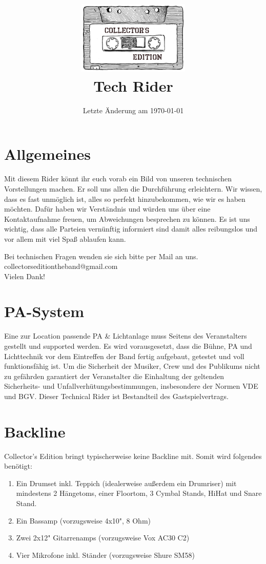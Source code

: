 \documentclass{article}
\title{\includegraphics[width=0.4\textwidth]{figures/BandLogo} \\Tech Rider}
\date{Letzte Änderung am \today}
\begin{document}
  \maketitle
  \thispagestyle{empty}

  \section*{Allgemeines}
  Mit diesem Rider könnt ihr euch vorab ein Bild von unseren technischen Vorstellungen machen.
   Er soll uns allen die Durchführung erleichtern. Wir wissen, dass es fast unmöglich ist, alles so
   perfekt hinzubekommen, wie wir es haben möchten. Dafür haben wir Verständnis und würden uns über eine
   Kontaktaufnahme freuen, um Abweichungen besprechen zu können. Es ist uns wichtig, dass alle Parteien
   vernünftig informiert sind damit alles reibungslos und vor allem mit viel Spaß ablaufen kann.

   Bei technischen Fragen wenden sie sich bitte per Mail an uns.\\
   collectorseditiontheband@gmail.com\\
   Vielen Dank!

  \section*{PA-System}

  Eine zur Location passende PA \& Lichtanlage muss Seitens des Veranstalters gestellt und supported
  werden. Es wird vorausgesetzt, dass die Bühne, PA und Lichttechnik vor dem Eintreffen der Band fertig
  aufgebaut, getestet und voll funktionsfähig ist. Um die Sicherheit der Musiker, Crew und des Publikums
  nicht zu gefährden garantiert der Veranstalter die Einhaltung der geltenden Sicherheits- und
  Unfallverhütungsbestimmungen, insbesondere der Normen VDE und BGV. Dieser Technical Rider ist
  Bestandteil des Gastspielvertrags.

  \section*{Backline}

  Collector's Edition bringt typischerweise keine Backline mit. Somit wird folgendes
  benötigt:

  \begin{enumerate}
  \item Ein Drumset inkl. Teppich (idealerweise außerdem ein Drumriser) mit
  mindestens 2 Hängetoms, einer Floortom, 3 Cymbal Stands, HiHat und Snare Stand.
  \item Ein Bassamp (vorzugsweise 4x10", 8 Ohm)
  \item Zwei 2x12" Gitarrenamps (vorzugsweise Vox AC30 C2)
  \item Vier Mikrofone inkl. Ständer (vorzugsweise Shure SM58)
  \end{enumerate}
\end{document}
